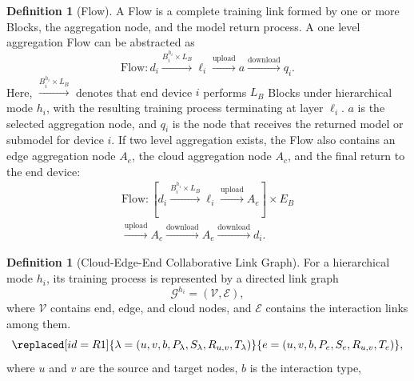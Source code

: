 ﻿\documentclass[preprint,12pt]{elsarticle}
\theoremstyle{plain}
\theoremstyle{definition}
\newtheorem{definition}[theorem]{Definition}
\theoremstyle{remark}
\begin{document}
\begin{definition}[Flow]
A Flow is a complete training link formed by one or more Blocks, the aggregation node, and the model return process.
A one level aggregation Flow can be abstracted as
\begin{equation}
    \text{Flow}: d_i \xrightarrow{B_i^{h_i}\times L_B} \ell_i
    \xrightarrow{\text{upload}} a
    \xrightarrow{\text{download}} q_i .
\end{equation}
Here, \(\xrightarrow{B_i^{h_i}\times L_B}\) denotes that end device \(i\) performs \(L_B\) Blocks under hierarchical mode \(h_i\), with the resulting training process terminating at layer \(\ell_i\). \(a\) is the selected aggregation node, and \(q_i\) is the node that receives the returned model or submodel for device \(i\).
If two level aggregation exists, the Flow also contains an edge aggregation node \(A_e\), the cloud aggregation node \(A_c\), and the final return to the end device:
\begin{equation}
\begin{aligned}
    \text{Flow}: [d_i \xrightarrow{B_i^{h_i}\times L_B} \ell_i
    \xrightarrow{\text{upload}} A_e] \times E_B\\
    \xrightarrow{\text{upload}} A_c
    \xrightarrow{\text{download}} A_e
    \xrightarrow{\text{download}} d_i .
\end{aligned}
\end{equation}
\end{definition}

\begin{definition}[Cloud-Edge-End Collaborative Link Graph]
For a hierarchical mode \(h_i\), its training process is represented by a directed link graph
\begin{equation}
    \mathcal{G}^{h_i}=(\mathcal{V},\mathcal{E}),
\end{equation}
where \(\mathcal{V}\) contains end, edge, and cloud nodes, and
\(\mathcal{E}\) contains the interaction links among them.
\begin{equation}
    \replaced[id=R1]{\lambda=(u,v,b,P_{\lambda},S_{\lambda},R_{u,v},T_{\lambda})}{e=(u,v,b,P_e,S_e,R_{u,v},T_e)},
\end{equation}
where \(u\) and \(v\) are the source and target nodes, \(b\) is the interaction type,
\end{definition}
\end{document}
